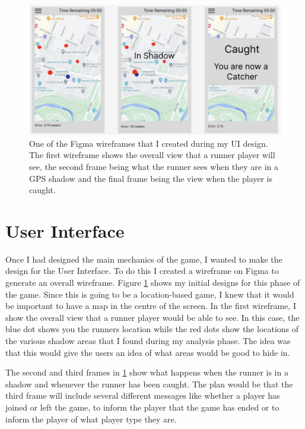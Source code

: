 \documentclass{l4proj}
\begin{document}
\begin{figure}
    \centering
    \includegraphics[width=0.7\linewidth]{images/phase1UIDesign.png}
    \caption{One of the Figma wireframes that I created during my UI design. The first wireframe shows the overall view that a runner
    player will see, the second frame being what the runner sees when they are in a GPS shadow and the final frame being the view when
    the player is caught.}
    \label{fig:phase1uidesign}
\end{figure}

\section{User Interface}
\label{phase1uidesign}
Once I had designed the main mechanics of the game, I wanted to make the design for the User Interface. To do this I created a wireframe
on Figma to generate an overall wireframe. Figure \ref{fig:phase1uidesign} shows my initial designs for this phase of the game. Since
this is going to be a location-based game, I knew that it would be important to have a map in the centre of the screen. In the first
wireframe, I show the overall view that a runner player would be able to see. In this case, the blue dot shows you the runners location while
the red dots show the locations of the various shadow areas that I found during my analysis phase. The idea was that this would give the
users an idea of what areas would be good to hide in.

The second and third frames in \ref{fig:phase1uidesign} show what happens when the runner is in a shadow and whenever the runner has been
caught. The plan would be that the third frame will include several different messages like whether a player has joined or left the
game, to inform the player that the game has ended or to inform the player of what player type they are. 
\end{document}
